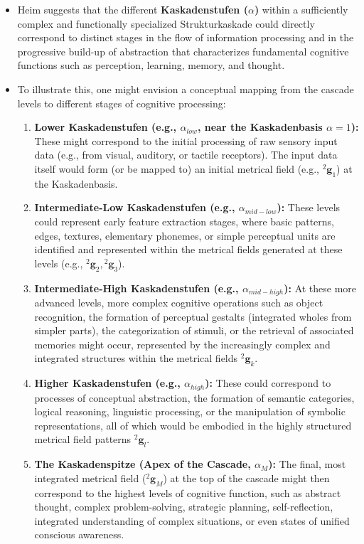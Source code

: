 \documentclass[
    12pt,              %
    a4paper,           %
    headings=normal,   %
    twoside=true,      %
    BCOR=8mm,          %
]{scrbook}
\newcommand{\kompositionsfeld}{{}^2\mathbf{g}}
\newcommand{\kaskadenstufe}{\alpha}
\begin{document}
\begin{itemize}
    \item   Heim suggests that the different \textbf{Kaskadenstufen (\(\kaskadenstufe\))} within a sufficiently complex and functionally specialized Strukturkaskade could directly correspond to distinct stages in the flow of information processing and in the progressive build-up of abstraction that characterizes fundamental cognitive functions such as perception, learning, memory, and thought.
    \item   To illustrate this, one might envision a conceptual mapping from the cascade levels to different stages of cognitive processing:
        \begin{enumerate}[label=\arabic*.]
            \item  \textbf{Lower Kaskadenstufen (e.g., \(\kaskadenstufe_{low}\), near the Kaskadenbasis \(\kaskadenstufe=1\)):} These might correspond to the initial processing of raw sensory input data (e.g., from visual, auditory, or tactile receptors). The input data itself would form (or be mapped to) an initial metrical field (e.g., \(\kompositionsfeld_1\)) at the Kaskadenbasis.
            \item  \textbf{Intermediate-Low Kaskadenstufen (e.g., \(\kaskadenstufe_{mid-low}\)):} These levels could represent early feature extraction stages, where basic patterns, edges, textures, elementary phonemes, or simple perceptual units are identified and represented within the metrical fields generated at these levels (e.g., \(\kompositionsfeld_2, \kompositionsfeld_3\)).
            \item  \textbf{Intermediate-High Kaskadenstufen (e.g., \(\kaskadenstufe_{mid-high}\)):} At these more advanced levels, more complex cognitive operations such as object recognition, the formation of perceptual gestalts (integrated wholes from simpler parts), the categorization of stimuli, or the retrieval of associated memories might occur, represented by the increasingly complex and integrated structures within the metrical fields \(\kompositionsfeld_k\).
            \item  \textbf{Higher Kaskadenstufen (e.g., \(\kaskadenstufe_{high}\)):} These could correspond to processes of conceptual abstraction, the formation of semantic categories, logical reasoning, linguistic processing, or the manipulation of symbolic representations, all of which would be embodied in the highly structured metrical field patterns \(\kompositionsfeld_l\).
            \item  \textbf{The Kaskadenspitze (Apex of the Cascade, \(\kaskadenstufe_M\)):} The final, most integrated metrical field (\(\kompositionsfeld_M\)) at the top of the cascade might then correspond to the highest levels of cognitive function, such as abstract thought, complex problem-solving, strategic planning, self-reflection, integrated understanding of complex situations, or even states of unified conscious awareness.

\end{enumerate}
\end{itemize}
\end{document}
